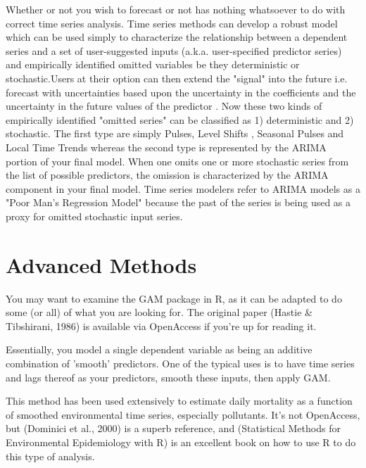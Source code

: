 \documentclass{article}\usepackage[]{graphicx}\usepackage[]{color}
\begin{document}
Whether or not you wish to forecast or not has nothing whatsoever to do with correct time series analysis. Time series methods can develop a robust model which can be used simply to characterize the relationship between a dependent series and a set of user-suggested inputs (a.k.a. user-specified predictor series) and empirically identified omitted variables be they deterministic or stochastic.Users at their option can then extend the "signal" into the future i.e. forecast with uncertainties based upon the uncertainty in the coefficients and the uncertainty in the future values of the predictor . Now these two kinds of empirically identified "omitted series" can be classified as 1) deterministic and 2) stochastic. The first type are simply Pulses, Level Shifts , Seasonal Pulses and Local Time Trends whereas the second type is represented by the ARIMA portion of your final model. When one omits one or more stochastic series from the list of possible predictors, the omission is characterized by the ARIMA component in your final model. Time series modelers refer to ARIMA models as a "Poor Man's Regression Model" because the past of the series is being used as a proxy for omitted stochastic input series.

\section{Advanced Methods}

You may want to examine the GAM package in R, as it can be adapted to do some (or all) of what you are looking for. The original paper (Hastie \& Tibshirani, 1986) is available via OpenAccess if you're up for reading it.

Essentially, you model a single dependent variable as being an additive combination of 'smooth' predictors. One of the typical uses is to have time series and lags thereof as your predictors, smooth these inputs, then apply GAM.

This method has been used extensively to estimate daily mortality as a function of smoothed environmental time series, especially pollutants. It's not OpenAccess, but (Dominici et al., 2000) is a superb reference, and (Statistical Methods for Environmental Epidemiology with R) is an excellent book on how to use R to do this type of analysis.
\end{document}
